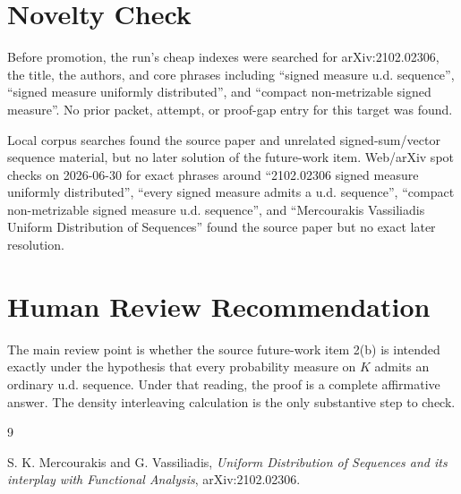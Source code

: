 \documentclass[11pt]{article}
\begin{document}
\section*{Novelty Check}

Before promotion, the run's cheap indexes were searched for arXiv:2102.02306,
the title, the authors, and core phrases including ``signed measure u.d.
sequence'', ``signed measure uniformly distributed'', and ``compact
non-metrizable signed measure''.  No prior packet, attempt, or proof-gap entry
for this target was found.

Local corpus searches found the source paper and unrelated signed-sum/vector
sequence material, but no later solution of the future-work item.  Web/arXiv
spot checks on 2026-06-30 for exact phrases around ``2102.02306 signed measure
uniformly distributed'', ``every signed measure admits a u.d. sequence'',
``compact non-metrizable signed measure u.d. sequence'', and ``Mercourakis
Vassiliadis Uniform Distribution of Sequences'' found the source paper but no
exact later resolution.

\section*{Human Review Recommendation}

The main review point is whether the source future-work item 2(b) is intended
exactly under the hypothesis that every probability measure on \(K\) admits an
ordinary u.d. sequence.  Under that reading, the proof is a complete
affirmative answer.  The density interleaving calculation is the only
substantive step to check.

\begin{thebibliography}{9}

S. K. Mercourakis and G. Vassiliadis,
\emph{Uniform Distribution of Sequences and its interplay with Functional
Analysis}, arXiv:2102.02306.

\end{thebibliography}
\end{document}
